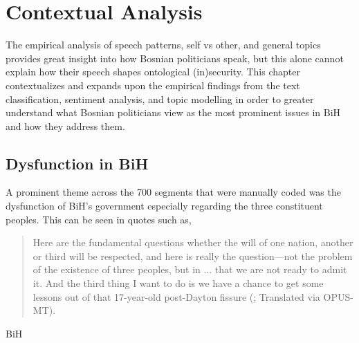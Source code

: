 \chapter{Contextual Analysis}
\label{chap:six}

The empirical analysis of speech patterns, self vs other, and general topics provides great insight into how Bosnian politicians speak, but this alone cannot explain how their speech shapes ontological (in)security. This chapter contextualizes and expands upon the empirical findings from the text classification, sentiment analysis, and topic modelling in order to greater understand what Bosnian politicians view as the most prominent issues in \ac{BiH} and how they address them.

\section{Dysfunction in BiH}

A prominent theme across the 700 segments that were manually coded was the dysfunction of \ac{BiH}'s government especially regarding the three constituent peoples. This can be seen in quotes such as, 
\begin{quote}
    Here are the fundamental questions whether the will of one nation, another or third will be respected, and here is really the question---not the problem of the existence of three peoples, but in ... that we are not ready to admit it. And the third thing I want to do is we have a chance to get some lessons out of that 17-year-old post-Dayton fissure (\citealp{mochtak2022}; Translated via OPUS-MT).
\end{quote}
\ac{BiH} 


